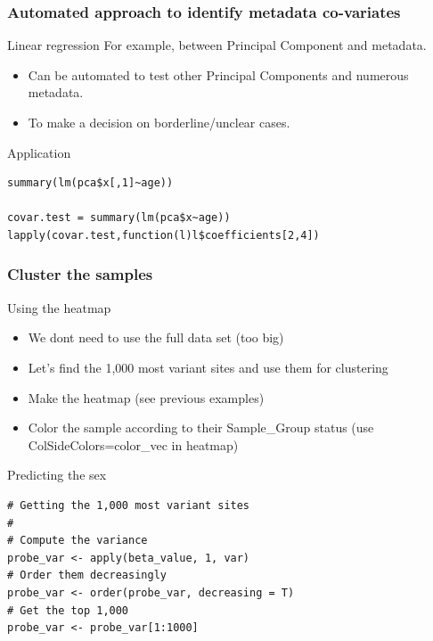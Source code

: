 \documentclass[10pt]{beamer}
\newenvironment{xframe}[2][]
  {\begin{frame}[fragile,environment=xframe,#1]
  \frametitle{#2}}
  {\end{frame}}
\begin{document}
\begin{xframe}{Automated approach to identify metadata co-variates}
  \begin{block}{Linear regression}
    For example, between Principal Component and metadata. 
    \begin{itemize}
    \item Can be automated to test other Principal Components and numerous metadata. 
    \item To make a decision on borderline/unclear cases.
    \end{itemize}    
  \end{block}
  \begin{exampleblock}{Application}
\begin{verbatim}
summary(lm(pca$x[,1]~age))

covar.test = summary(lm(pca$x~age))
lapply(covar.test,function(l)l$coefficients[2,4])
\end{verbatim}  
  \end{exampleblock}
\end{xframe}


\begin{xframe}{Cluster the samples}
  \begin{block}{Using the heatmap}
    \begin{itemize}
      \item We dont need to use the full data set (too big)
      \item Let's find the 1,000 most variant sites and use them for clustering
      \item Make the heatmap (see previous examples)
      \item Color the sample according to their Sample\_Group status (use
      ColSideColors=color\_vec in heatmap)
    \end{itemize}
      \end{block}
    \begin{exampleblock}{Predicting the sex}
\begin{verbatim}
# Getting the 1,000 most variant sites
#
# Compute the variance
probe_var <- apply(beta_value, 1, var)
# Order them decreasingly
probe_var <- order(probe_var, decreasing = T)
# Get the top 1,000
probe_var <- probe_var[1:1000]
\end{verbatim}  
  \end{exampleblock}   

\end{xframe}
\end{document}
